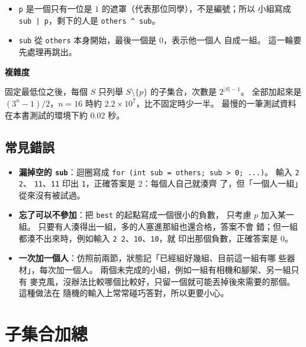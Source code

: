 
\begin{itemize}
\item \texttt{p} 是一個只有一位是 $1$ 的遮罩（代表那位同學），不是編號；所以
小組寫成 \texttt{sub | p}，剩下的人是 \texttt{others \^{} sub}。
\item \texttt{sub} 從 \texttt{others} 本身開始，最後一個是 $0$，表示他一個人
自成一組。 這一輪要先處理再跳出。
\end{itemize}

\textbf{複雜度}

固定最低位之後，每個 $S$ 只列舉 $S \setminus \{p\}$ 的子集合，次數是
$2^{|S| - 1}$。 全部加起來是 $(3^n - 1)/2$，$n = 16$ 時約
$2.2 \times 10^7$，比不固定時少一半。 最慢的一筆測試資料在本書測試的環境下約
$0.02$ 秒。

\subsection{常見錯誤}

\begin{itemize}
\item \textbf{漏掉空的 \texttt{sub}}：迴圈寫成
\texttt{for (int sub = others; sub > 0; ...)}。 輸入 \texttt{2 2}、
\texttt{11}、\texttt{11} 印出 \texttt{1}，正確答案是 $2$：每個人自己就湊齊
了，但「一個人一組」從來沒有被試過。
\item \textbf{忘了可以不參加}：把 \texttt{best} 的起點寫成一個很小的負數，
只考慮 $p$ 加入某一組。 只要有人湊得出一組，多的人塞進那組也還合格，答案不會
錯；但一組都湊不出來時，例如輸入 \texttt{2 2}、\texttt{10}、\texttt{10}，就
印出那個負數，正確答案是 $0$。
\item \textbf{一次加一個人}：仿照前兩節，狀態記「已經組好幾組、目前這一組有哪
些器材」，每次加一個人。 兩個未完成的小組，例如一組有相機和腳架、另一組只有
麥克風，沒辦法比較哪個比較好，只留一個就可能丟掉後來需要的那個。 這種做法在
隨機的輸入上常常碰巧答對，所以更要小心。
\end{itemize}

\section{子集合加總}
\label{sec:bm-sos}

